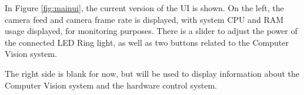 In Figure \ref*{fig:mainui}, the current version of the UI is shown. On the left, the camera feed and camera frame rate is displayed, with system
CPU and RAM usage displayed, for monitoring purposes. There is a slider to adjust the power of the connected LED Ring light, as well as two buttons
related to the Computer Vision system.

The right side is blank for now, but will be used to display information about the Computer Vision system and the hardware control system.